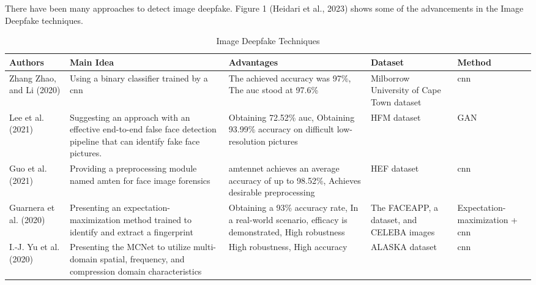  
There have been many approaches to detect image deepfake. Figure 1 (Heidari et al., 2023) \cite{heidari2023deepfake}  shows some of the advancements in the Image Deepfake techniques.

\begin{table}
\caption{Image Deepfake Techniques}
\begin{tabularx}{\textwidth}{|X|X|X|X|X|}
  \hline
  \textbf{Authors} & \textbf{Main Idea} & \textbf{Advantages} & \textbf{Dataset} & \textbf{Method} \\ \hline
  Zhang Zhao, and Li (2020) \cite{zhang2020novel} & Using a binary classifier trained by a \acrshort{cnn} & The achieved accuracy was 97\%, The \acrshort{auc} stood at 97.6\% & Milborrow University of Cape Town dataset & \acrshort{cnn} \\ \hline
  Lee et al. (2021) \cite{lee2021detecting}& Suggesting an approach with an effective end-to-end false face detection pipeline  that can identify fake face pictures. & Obtaining 72.52\% \acrshort{auc}, Obtaining 93.99\% accuracy on difficult low-resolution pictures & HFM dataset & GAN \\ \hline
  Guo et al. (2021) \cite{guo2021fake}& Providing a preprocessing module named \acrshort{amten} for face image forensics & \acrshort{amten}net achieves an average accuracy of up to 98.52\%, Achieves desirable preprocessing & HEF dataset & \acrshort{cnn} \\ \hline
  Guarnera et al. (2020) \cite{guarnera2020fighting} & Presenting an expectation-maximization method trained to identify and extract a fingerprint & Obtaining a 93\% accuracy rate, In a real-world scenario, efficacy is demonstrated, High robustness & The FACEAPP, a dataset, and CELEBA images & Expectation-maximization + \acrshort{cnn} \\ \hline
  I.-J. Yu et al. (2020) \cite{yu2020manipulation} & Presenting the MCNet to utilize multi-domain spatial, frequency, and compression domain characteristics & High robustness, High accuracy & ALASKA dataset & \acrshort{cnn} \\ \hline
\end{tabularx}
\end{table}

